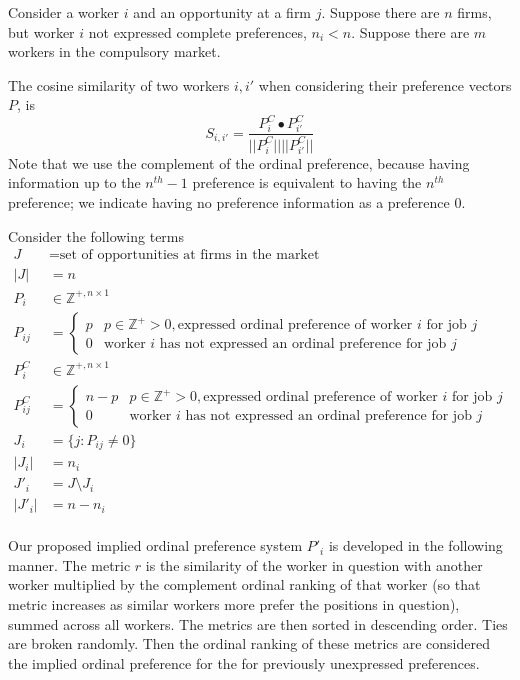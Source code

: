 Consider a worker $i$ and an opportunity at a firm $j$. Suppose there are $n$ firms, but worker $i$ not expressed complete preferences, $n_i < n$. Suppose there are $m$ workers in the compulsory market.

The cosine similarity of two workers $i, i'$ when considering their preference vectors $P$, is
\[S_{i, i'} = \frac{P^C_{i} \bullet P^C_{i'}}{||P^C_i|| ||P^C_{i'}||}\]
Note that we use the complement of the ordinal preference, because having information up to the  $n^{th} - 1$ preference is equivalent to having the $n^{th}$ preference; we indicate having no preference information as a preference 0.

Consider the following terms 
\begin{align*}
J &= \text{set of opportunities at firms in the market} \\
|J| &= n \\
P_i & \in \mathbb{Z}^{+, n \times 1} \\
P_{ij} &= \begin{cases}
p & p \in \mathbb{Z}^+ > 0, \text{expressed ordinal preference of worker $i$ for job $j$}\\
0 & \text{worker $i$ has not expressed an ordinal preference for job $j$}
\end{cases} \\
P^C_i & \in \mathbb{Z}^{+, n \times 1} \\
P^C_{ij} &= \begin{cases}
n-p & p \in \mathbb{Z}^+ > 0, \text{expressed ordinal preference of worker $i$ for job $j$}\\
0 & \text{worker $i$ has not expressed an ordinal preference for job $j$}
\end{cases} \\
J_i &= \{j : P_{ij} \neq 0\} \\
|J_i| &= n_i \\
J'_i &= J \setminus J_i \\
|J'_i| &= n - n_i \\
\end{align*}

Our proposed implied ordinal preference system $P'_i$ is developed in the following manner. The metric $r$ is the similarity of the worker in question with another worker multiplied by the complement ordinal ranking of that worker (so that metric increases as similar workers more prefer the positions in question), summed across all workers. The metrics are then sorted in descending order. Ties are broken randomly. Then the ordinal ranking of these metrics are considered the implied ordinal preference for the for previously unexpressed preferences.

